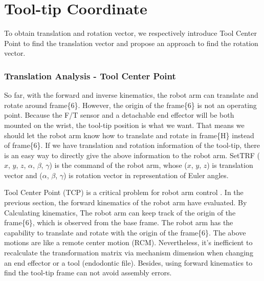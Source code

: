 \section{Tool-tip Coordinate}
\label{sec:ref_robot}
\hspace*{6mm}To obtain translation and rotation vector, we respectively introduce Tool Center Point to find the translation vector and propose an approach to find the rotation vector.				
\subsubsection{Translation Analysis - Tool Center Point}
\label{sec:tcp}
\hspace*{6mm}So far, with the forward and inverse kinematics, the robot arm can translate and rotate around frame\{6\}. However, the origin of the frame\{6\} is not an operating point. Because the F/T sensor and a detachable end effector will be both mounted on the wrist, the tool-tip position is what we want. That means we should let the robot arm know how to translate and rotate in frame\{H\} instead of frame\{6\}. If we have translation and rotation information of the tool-tip, there is an easy way to directly give the above information to the robot arm. SetTRF ($x$, $y$, $z$, $\alpha$, $\beta$, $\gamma$) is the command of the robot arm, whose ($x$, $y$, $z$) is translation vector and ($\alpha$, $\beta$, $\gamma$) is rotation vector in representation of Euler angles.
\par
Tool Center Point (TCP) is a critical problem for robot arm control \cite{yang2017four}. In the previous section, the forward kinematics of the robot arm have evaluated. By Calculating kinematics, The robot arm can keep track of the origin of the frame\{6\}, which is observed from the base frame. The robot arm has the capability to translate and rotate with the origin of the frame\{6\}. The above motions are like a remote center motion (RCM).  Nevertheless, it's inefficient to recalculate the transformation matrix via mechanism dimension when changing an end effector or a tool (endodontic file). Besides, using forward kinematics to find the tool-tip frame can not avoid assembly errors.
